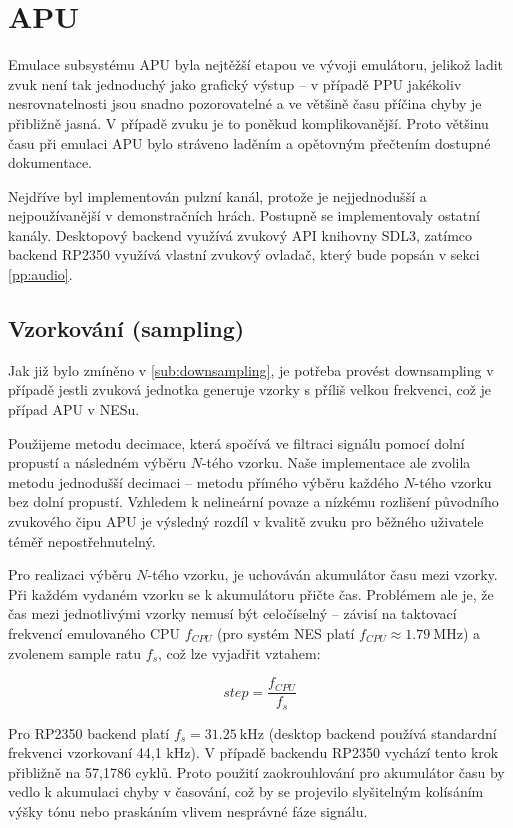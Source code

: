 \section{APU}

Emulace subsystému APU byla nejtěžší etapou ve vývoji emulátoru, jelikož ladit zvuk není tak
jednoduchý jako grafický výstup -- v případě PPU jakékoliv nesrovnatelnosti jsou snadno
pozorovatelné a ve většině času příčina chyby je přibližně jasná. V případě zvuku je to poněkud
komplikovanější. Proto většinu času při emulaci APU bylo stráveno laděním a opětovným přečtením
dostupné dokumentace.

Nejdříve byl implementován pulzní kanál, protože je nejjednodušší a nejpoužívanější v demonstračních
hrách. Postupně se implementovaly ostatní kanály. Desktopový backend využívá zvukový API knihovny
SDL3, zatímco backend RP2350 využívá vlastní zvukový ovladač, který bude popsán v sekci
\ref{pp:audio}.

\subsection{Vzorkování (sampling)}

Jak již bylo zmíněno v \ref{sub:downsampling}, je potřeba provést downsampling v případě jestli
zvuková jednotka generuje vzorky s příliš velkou frekvenci, což je případ APU v NESu.

Použijeme metodu decimace, která spočívá ve filtraci signálu pomocí dolní propustí a následném
výběru $N$-tého vzorku. Naše implementace ale zvolila metodu jednodušší decimaci -- metodu přímého
výběru každého $N$-tého vzorku bez dolní propustí. Vzhledem k nelineární povaze a nízkému rozlišení
původního zvukového čipu APU je výsledný rozdíl v kvalitě zvuku pro běžného uživatele téměř
nepostřehnutelný.

Pro realizaci výběru $N$-tého vzorku, je uchováván akumulátor času mezi vzorky. Při každém vydaném
vzorku se k akumulátoru přičte čas. Problémem ale je, že čas mezi jednotlivými vzorky nemusí být
celočíselný -- závisí na taktovací frekvencí emulovaného CPU $f_{CPU}$ (pro systém NES platí
$f_{CPU} \approx \SI{1.79}{\mega\hertz}$) a zvolenem sample ratu $f_s$, což lze vyjadřit vztahem:

$$
step = \frac{f_{CPU}}{f_s}
$$

Pro RP2350 backend platí $f_s = \SI{31.25}{\kilo\hertz}$ (desktop backend používá standardní frekvenci vzorkovaní
44,1 kHz). V případě backendu RP2350 vychází tento krok přibližně na 57,1786 cyklů.
Proto použití zaokrouhlování pro akumulátor času by vedlo k akumulaci chyby v časování, což by se
projevilo slyšitelným kolísáním výšky tónu nebo praskáním vlivem nesprávné fáze signálu.


